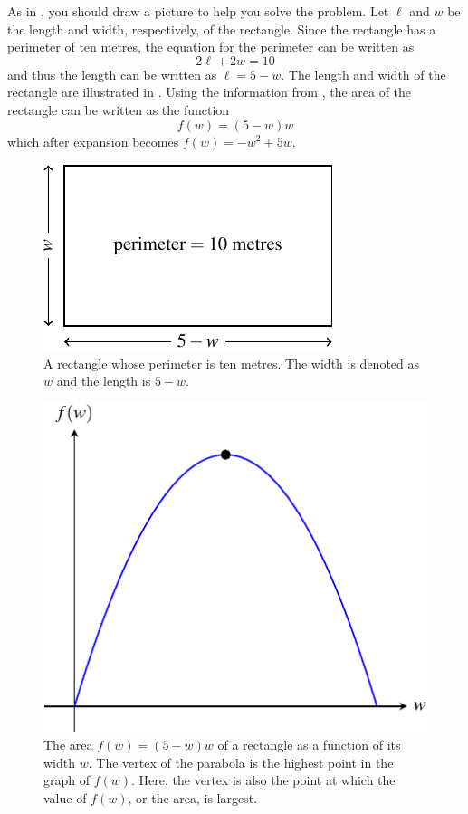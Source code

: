 \documentclass[a4paper,oneside,12pt]{article}
\begin{document}
\begin{solution}
As in , you
should draw a picture to help you solve the problem.  Let $\ell$ and
$w$ be the length and width, respectively, of the rectangle.  Since
the rectangle has a perimeter of ten metres, the equation for the
perimeter can be written as
\[
2\ell + 2w
=
10
\]
and thus the length can be written as $\ell = 5 - w$.  The length and
width of the rectangle are illustrated in
.  Using the information from
, the area of the rectangle can be
written as the function
\[
f(w)
=
(5 - w)w
\]
which after expansion becomes $f(w) = -w^2 + 5w$.

\begin{figure}[!htbp]
\centering
\includegraphics[scale=1]{image/09/largest-area.pdf}
\caption{%
  A rectangle whose perimeter is ten metres.  The width is denoted as
  $w$ and the length is $5 - w$.
}
\label{fig:largest_area_rectangle}
\end{figure}

\begin{figure}[!htbp]
\centering
\includegraphics[scale=1]{image/09/rectangle-area.pdf}
\caption{%
  The area $f(w) = (5 - w) w$ of a rectangle as a function of its
  width $w$.  The vertex of the parabola is the highest point in the
  graph of $f(w)$.  Here, the vertex is also the point at which the
  value of $f(w)$, or the area, is largest.
}
\label{fig:largest_area_graph_parabola}
\end{figure}


\end{solution}
\end{document}
